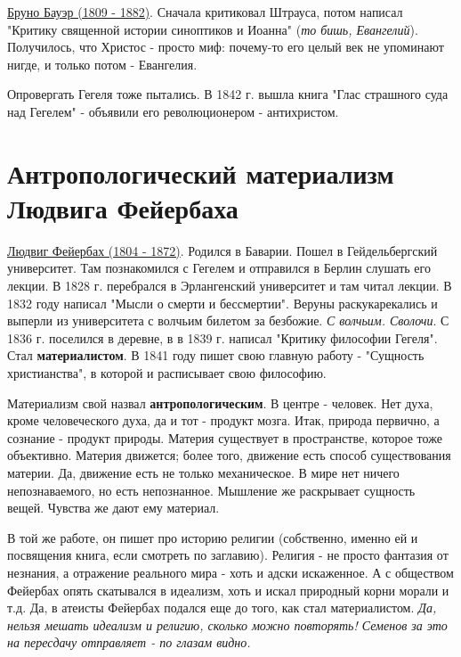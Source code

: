 \underline{Бруно Бауэр (1809 - 1882)}. Сначала критиковал Штрауса, потом написал "Критику священной истории синоптиков и Иоанна" (\textit{то бишь, Евангелий}). Получилось, что Христос - просто миф: почему-то его целый век не упоминают нигде, и только потом - Евангелия.

Опровергать Гегеля тоже пытались. В 1842 г. вышла книга "Глас страшного суда над Гегелем" - объявили его революционером - антихристом.
 
\section{Антропологический материализм Людвига Фейербаха}
\underline{Людвиг Фейербах (1804 - 1872)}. Родился в Баварии. Пошел в Гейдельбергский университет. Там познакомился с Гегелем и отправился в Берлин слушать его лекции. В 1828 г. перебрался в Эрлангенский университет и там читал лекции. В 1832 году написал "Мысли о смерти и бессмертии". Веруны раскукарекались и выперли из университета с волчьим билетом за безбожие. \textit{С волчьим. Сволочи}. С 1836 г. поселился в деревне, в в 1839 г. написал "Критику философии Гегеля". Стал \textbf{материалистом}. В 1841 году пишет свою главную работу - "Сущность христианства", в которой и расписывает свою философию. 

Материализм свой назвал \textbf{антропологическим}. В центре - человек. Нет духа, кроме человеческого духа, да и тот - продукт мозга. Итак, природа первично, а сознание - продукт природы. Материя существует в пространстве, которое тоже объективно. Материя движется; более того, движение есть способ существования материи. Да, движение есть не только механическое. В мире нет ничего непознаваемого, но есть непознанное. Мышление же раскрывает сущность вещей. Чувства же дают ему материал.

В той же работе, он пишет про историю религии (собственно, именно ей и посвящения книга, если смотреть по заглавию). Религия - не просто фантазия от незнания, а отражение реального мира - хоть и адски искаженное. А с обществом Фейербах опять скатывался в идеализм, хоть и искал природный корни морали и т.д. Да, в атеисты Фейербах подался еще до того, как стал материалистом. \textit{Да, нельзя мешать идеализм и религию, сколько можно повторять! Семенов за это на пересдачу отправляет - по глазам видно.} 

